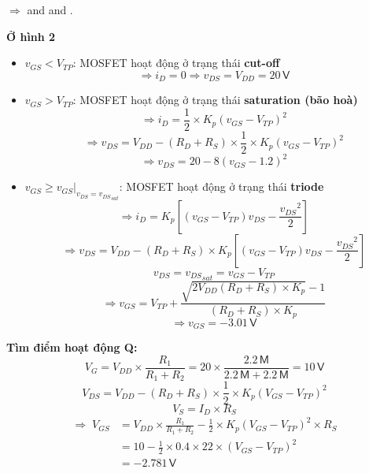 $\Rightarrow$  and  and .

\begin{center}
	\textbf{Ở hình 2}
\end{center}


\begin{itemize}[label=-]
	\item $v_{GS}<V_{TP}$: MOSFET hoạt động ở trạng thái \textbf{cut-off}
	\[
	\Rightarrow i_{D}=0 \Rightarrow v_{DS}=V_{DD}=20\,\textsf{V}
	\]
	
	\item $v_{GS}>V_{TP}$: MOSFET hoạt động ở trạng thái \textbf{saturation (bão hoà)}
	\[
	\Rightarrow i_{D}=\frac{1}{2}\times K_{p}\left(v_{GS}-V_{TP}\right)^{2}
	\]
	\[
	\Rightarrow v_{DS}=V_{DD}-\left(R_{D}+R_{S}\right)\times\frac{1}{2}\times K_{p}\left(v_{GS}-V_{TP}\right)^{2}
	\]
	\[
	\Rightarrow v_{DS}=20-8\left(v_{GS}-1.2\right)^{2}
	\]
	
	\item $v_{GS}\geq \left.v_{GS}\right|_{v_{DS}={v_{DS}}_{sat}}$: MOSFET hoạt động ở trạng thái \textbf{triode}
	\[
	\Rightarrow i_{D}=K_{p}\left[\left(v_{GS}-V_{TP}\right)v_{DS}-\frac{{v_{DS}}^{2}}{2}\right]
	\]
	\[
	\Rightarrow v_{DS}=V_{DD}-\left(R_{D}+R_{S}\right)\times K_{p}\left[\left(v_{GS}-V_{TP}\right)v_{DS}-\frac{{v_{DS}}^{2}}{2}\right]
	\]
	\[
	v_{DS}={v_{DS}}_{sat}=v_{GS}-V_{TP}
	\]
	\[
	\Rightarrow v_{GS}=V_{TP}+\frac{\sqrt{2V_{DD}\left(R_{D}+R_{S}\right)\times K_{p}}-1}{\left(R_{D}+R_{S}\right)\times K_{p}}
	\]
	\[
	\Rightarrow v_{GS}=-3.01\,\textsf{V}
	\]
\end{itemize}

\textbf{Tìm điểm hoạt động Q:}
\[
V_{G}=V_{DD}\times\frac{R_{1}}{R_{1}+R_{2}}=20\times\frac{2.2\,\textsf{M}}{2.2\,\textsf{M}+2.2\,\textsf{M}}=10\,\textsf{V}
\]
\[
V_{DS}=V_{DD}-\left(R_{D}+R_{S}\right)\times\frac{1}{2}\times K_{p}\left(V_{GS}-V_{TP}\right)^{2}
\]
\[
V_{S}=I_{D}\times R_{S}
\]
\[
\begin{aligned}
	\Rightarrow\; V_{GS} &= V_{DD}\times\frac{R_{1}}{R_{1}+R_{2}}
	- \frac{1}{2}\times K_{p}\left(V_{GS}-V_{TP}\right)^{2}\times R_{S} \\[6pt]
	&= 10 - \frac{1}{2}\times0.4\times22\times\left(V_{GS}-V_{TP}\right)^{2} \\[6pt]
	&= -2.781\,\textsf{V}
\end{aligned}
\]

